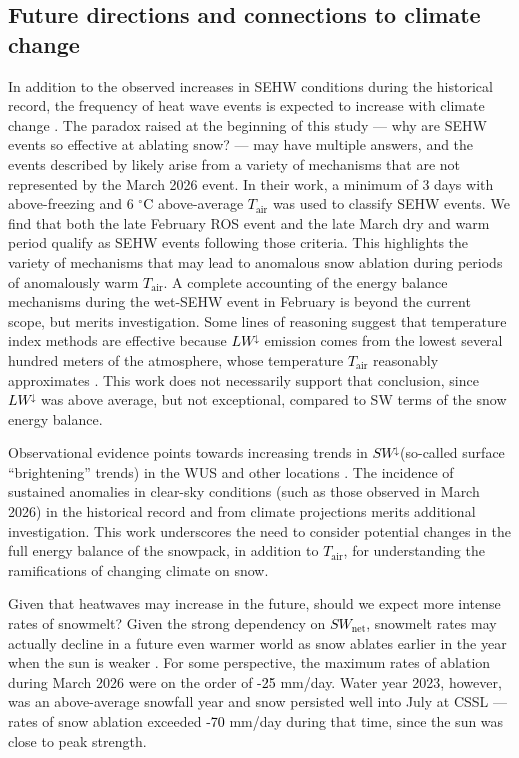 \documentclass[draft]{agujournal2019}
\newcommand{\mynum}[1]{\textcolor{black}{#1}}
\newcommand{\tair}{\textcolor{black}{$T_{\mathrm{air}}$}\xspace}
\newcommand{\lwdn}{\textcolor{black}{$LW^{\downarrow}$}\xspace}
\newcommand{\swnet}{\textcolor{black}{$SW_{\mathrm{net}}$}\xspace}
\newcommand{\swdn}{\textcolor{black}{$SW^{\downarrow}$}\xspace}
\newcommand{\degrc}{\textcolor{black}{$^\circ$C}\xspace}
\begin{document}
\subsection{Future directions and connections to climate change}
In addition to the observed increases in SEHW conditions during the historical record, the frequency of heat wave events is expected to increase with climate change \cite{Seneviratne2023-pj}.
The paradox raised at the beginning of this study --- why are SEHW events so effective at ablating snow? --- may have multiple answers, and the events described by  likely arise from a variety of mechanisms that are not represented by the March 2026 event.
In their work, a minimum of 3 days with above-freezing and 6 \degrc above-average \tair was used to classify SEHW events.
We find that both the late February ROS event and the late March dry and warm period qualify as SEHW events following those criteria.
This highlights the variety of mechanisms that may lead to anomalous snow ablation during periods of anomalously warm \tair.
A complete accounting of the energy balance mechanisms during the wet-SEHW event in February is beyond the current scope, but merits investigation.
Some lines of reasoning suggest that temperature index methods are effective because \lwdn emission comes from the lowest several hundred meters of the atmosphere, whose temperature \tair reasonably approximates \cite{Ohmura2001-ll}.
This work does not necessarily support that conclusion, since \lwdn was above average, but not exceptional, compared to SW terms of the snow energy balance.

Observational evidence points towards increasing trends in \swdn (so-called surface ``brightening'' trends) in the WUS and other locations \cite{Long2009-zr, McKinnon2025-va}.
The incidence of sustained anomalies in clear-sky conditions (such as those observed in March 2026) in the historical record and from climate projections merits additional investigation. 
This work underscores the need to consider potential changes in the full energy balance of the snowpack, in addition to \tair, for understanding the ramifications of changing climate on snow.

Given that heatwaves may increase in the future, should we expect more intense rates of snowmelt? 
Given the strong dependency on \swnet, snowmelt rates may actually decline in a future even warmer world as snow ablates earlier in the year when the sun is weaker \cite{Musselman2017-av}.
For some perspective, the maximum rates of ablation during March 2026 were on the order of \mynum{-25} mm/day.
Water year 2023, however, was an above-average snowfall year and snow persisted well into July at CSSL --- rates of snow ablation exceeded \mynum{-70} mm/day during that time, since the sun was close to peak strength.
\end{document}
